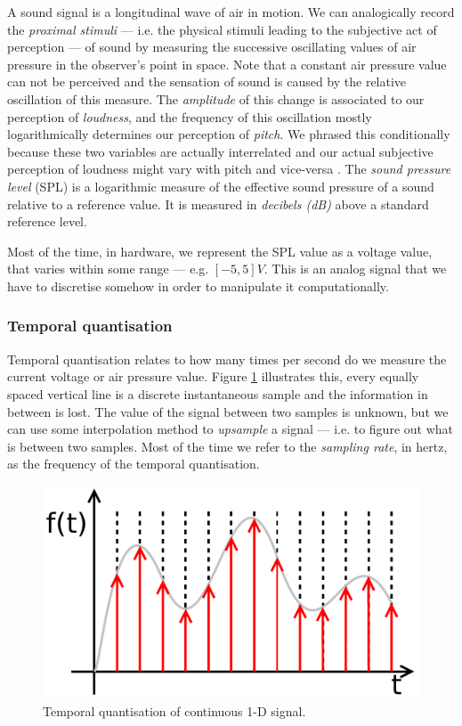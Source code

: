 A sound signal is a longitudinal
wave of air in motion. We can analogically record the
\emph{proximal stimuli} --- i.e. the physical
stimuli leading to the subjective act of perception
\cite{goldstein01sensation} --- of sound by measuring the successive
oscillating values of air pressure in the observer's point in
space. Note that a constant air pressure value can not be perceived
and the sensation of sound is caused by the relative oscillation of
this measure. The \emph{amplitude} of this change is
associated to our perception of \emph{loudness}, and
the frequency of this oscillation mostly logarithmically determines
our perception of \emph{pitch}. We phrased this
conditionally because these two variables are actually interrelated
and our actual subjective perception of loudness might vary with pitch
and vice-versa \cite{fletcher37loudness}. The \emph{sound pressure
  level} (SPL) is a logarithmic measure of the effective sound
pressure of a sound relative to a reference value. It is measured in
\emph{decibels (dB)} above a standard reference
level.

Most of the time, in hardware, we represent the SPL value as a voltage
value, that varies within some range --- e.g. $[ -5, 5 ] V$. This is
an analog signal that we have to discretise somehow in order to
manipulate it computationally.

\subsubsection{Temporal quantisation}

Temporal quantisation relates to how many
times per second do we measure the current voltage or air pressure
value. Figure \ref{fig:sampled-1} illustrates this, every equally
spaced vertical line is a discrete instantaneous sample and the
information in between is lost. The value of the signal between two
samples is unknown, but we can use some interpolation method to
\emph{upsample} a signal --- i.e. to figure out what
is between two samples. Most of the time we refer to the
\emph{sampling rate}, in hertz, as the frequency of
the temporal quantisation.

\begin{figure}[h!]
  \centering
  \includegraphics[width=.7\textwidth]{pic/sampled-1.pdf}
  \caption{Temporal quantisation of continuous 1-D signal.}
  \label{fig:sampled-1}  
\end{figure}

